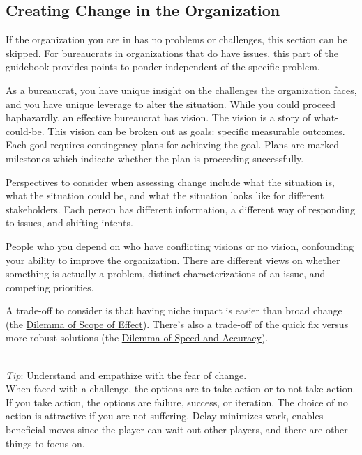 \subsection*{Creating Change in the Organization\label{sec:creating-change}}

If the organization you are in has no problems or challenges, this section can be skipped. For bureaucrats in organizations that do have issues, this part of the guidebook provides points to ponder independent of the specific problem.

As a bureaucrat, you have unique insight on the challenges the organization faces, and you have unique leverage to alter the situation.  While you could proceed haphazardly, an effective bureaucrat has vision. The vision is a story of what-could-be. This vision can be broken out as goals: specific measurable outcomes. Each goal requires contingency plans for achieving the goal. Plans are marked milestones which indicate whether the plan is proceeding successfully. 

Perspectives to consider when assessing change include what the situation is, what the situation could be, and what the situation looks like for different stakeholders. Each person has different information, a different way of responding to issues, and shifting intents.

People who you depend on who have conflicting visions or no vision, confounding your ability to improve the organization. There are different views on whether something is actually a problem, distinct characterizations of an issue, and competing priorities.

A trade-off to consider is that having niche impact is easier than broad change (the \hyperref[table:scope-broad-vs-narrow]{Dilemma of Scope of Effect}). There's also a trade-off of the quick fix versus more robust solutions (the \hyperref[table:quick-methodical]{Dilemma of Speed and Accuracy}).



\ \\
\textit{Tip}: Understand and empathize with the fear of change. \\
When faced with a challenge, the options are to take action or to not take action. If you take action, the options are failure, success, or iteration. 
The choice of no action is attractive if you are not suffering. Delay minimizes work, enables beneficial moves since the player can wait out other players, and there are other things to focus on.

